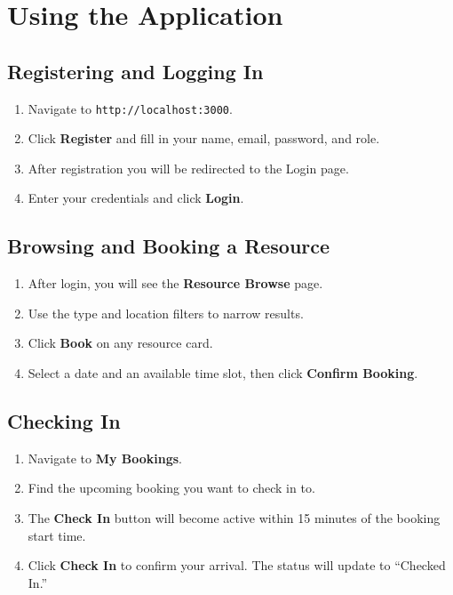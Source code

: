 \documentclass[12pt]{article}
\begin{document}
\section{Using the Application}

\subsection{Registering and Logging In}
\begin{enumerate}
    \item Navigate to \texttt{http://localhost:3000}.
    \item Click \textbf{Register} and fill in your name, email, password, and role.
    \item After registration you will be redirected to the Login page.
    \item Enter your credentials and click \textbf{Login}.
\end{enumerate}

\subsection{Browsing and Booking a Resource}
\begin{enumerate}
    \item After login, you will see the \textbf{Resource Browse} page.
    \item Use the type and location filters to narrow results.
    \item Click \textbf{Book} on any resource card.
    \item Select a date and an available time slot, then click \textbf{Confirm Booking}.
\end{enumerate}

\subsection{Checking In}
\begin{enumerate}
    \item Navigate to \textbf{My Bookings}.
    \item Find the upcoming booking you want to check in to.
    \item The \textbf{Check In} button will become active within 15 minutes of the booking start time.
    \item Click \textbf{Check In} to confirm your arrival. The status will update to ``Checked In.''
\end{enumerate}
\end{document}
